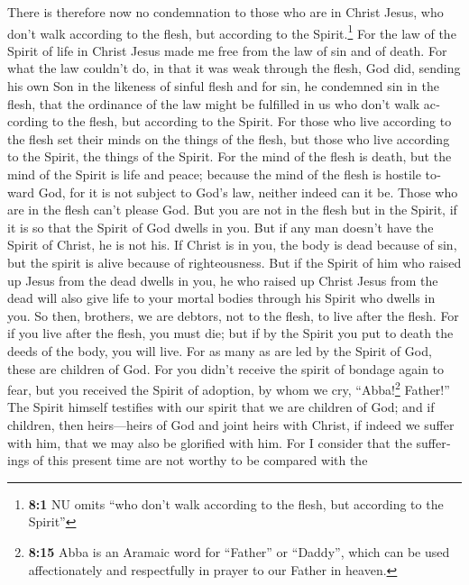 \begin{paracol}{2}
\begin{otherlanguage}{english}
 There is therefore now no condemnation to those who are
in Christ Jesus, who don't walk according to the flesh, but according to
the Spirit.\footnote{\textbf{8:1} NU omits ``who don't walk according to
  the flesh, but according to the Spirit''}  For the law
of the Spirit of life in Christ Jesus made me free from the law of sin
and of death.  For what the law couldn't do, in that it
was weak through the flesh, God did, sending his own Son in the likeness
of sinful flesh and for sin, he condemned sin in the flesh,
 that the ordinance of the law might be fulfilled in us
who don't walk according to the flesh, but according to the Spirit.
 For those who live according to the flesh set their minds
on the things of the flesh, but those who live according to the Spirit,
the things of the Spirit.  For the mind of the flesh is
death, but the mind of the Spirit is life and peace; 
because the mind of the flesh is hostile toward God, for it is not
subject to God's law, neither indeed can it be.  Those who
are in the flesh can't please God.  But you are not in the
flesh but in the Spirit, if it is so that the Spirit of God dwells in
you. But if any man doesn't have the Spirit of Christ, he is not his.
 If Christ is in you, the body is dead because of sin,
but the spirit is alive because of righteousness.  But if
the Spirit of him who raised up Jesus from the dead dwells in you, he
who raised up Christ Jesus from the dead will also give life to your
mortal bodies through his Spirit who dwells in you.  So
then, brothers, we are debtors, not to the flesh, to live after the
flesh.  For if you live after the flesh, you must die;
but if by the Spirit you put to death the deeds of the body, you will
live.  For as many as are led by the Spirit of God, these
are children of God.  For you didn't receive the spirit
of bondage again to fear, but you received the Spirit of adoption, by
whom we cry, ``Abba!\footnote{\textbf{8:15} Abba is an Aramaic word for
  ``Father'' or ``Daddy'', which can be used affectionately and
  respectfully in prayer to our Father in heaven.} Father!''
 The Spirit himself testifies with our spirit that we are
children of God;  and if children, then heirs---heirs of
God and joint heirs with Christ, if indeed we suffer with him, that we
may also be glorified with him.  For I consider that the
sufferings of this present time are not worthy to be compared with the

\end{otherlanguage}
\end{paracol}
